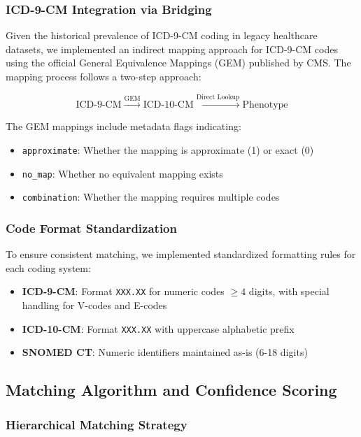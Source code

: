 \documentclass[11pt]{article}
\begin{document}
\subsubsection{ICD-9-CM Integration via Bridging}

Given the historical prevalence of ICD-9-CM coding in legacy healthcare datasets, we implemented an indirect mapping approach for ICD-9-CM codes using the official General Equivalence Mappings (GEM) published by CMS. The mapping process follows a two-step approach:

\begin{equation}
\text{ICD-9-CM} \xrightarrow{\text{GEM}} \text{ICD-10-CM} \xrightarrow{\text{Direct Lookup}} \text{Phenotype}
\end{equation}

The GEM mappings include metadata flags indicating:
\begin{itemize}
    \item \texttt{approximate}: Whether the mapping is approximate (1) or exact (0)
    \item \texttt{no\_map}: Whether no equivalent mapping exists
    \item \texttt{combination}: Whether the mapping requires multiple codes
\end{itemize}

\subsubsection{Code Format Standardization}

To ensure consistent matching, we implemented standardized formatting rules for each coding system:

\begin{itemize}
    \item \textbf{ICD-9-CM}: Format \texttt{XXX.XX} for numeric codes $\geq 4$ digits, with special handling for V-codes and E-codes
    \item \textbf{ICD-10-CM}: Format \texttt{XXX.XX} with uppercase alphabetic prefix
    \item \textbf{SNOMED CT}: Numeric identifiers maintained as-is (6-18 digits)
\end{itemize}

\subsection{Matching Algorithm and Confidence Scoring}

\subsubsection{Hierarchical Matching Strategy}
\end{document}
